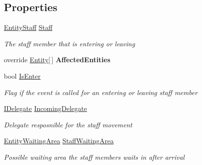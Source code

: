 \subsection*{Properties}
\begin{DoxyCompactItemize}
\item 
\hyperlink{class_simulation_core_1_1_h_c_c_m_elements_1_1_entity_staff}{Entity\+Staff} \hyperlink{class_general_health_care_elements_1_1_events_1_1_event_control_unit_staff_enter_leave_a3da4da7b0e7aef04a20e243946b8a324}{Staff}
\begin{DoxyCompactList}\small\item\em The staff member that is entering or leaving \end{DoxyCompactList}\item 
override \hyperlink{class_simulation_core_1_1_h_c_c_m_elements_1_1_entity}{Entity}\mbox{[}$\,$\mbox{]} {\bfseries Affected\+Entities}\hypertarget{class_general_health_care_elements_1_1_events_1_1_event_control_unit_staff_enter_leave_a26369090365f08bbcf88f4ddeef4bfab}{}\label{class_general_health_care_elements_1_1_events_1_1_event_control_unit_staff_enter_leave_a26369090365f08bbcf88f4ddeef4bfab}

\item 
bool \hyperlink{class_general_health_care_elements_1_1_events_1_1_event_control_unit_staff_enter_leave_a8ec37ba23d4b39d58ff93f45af63d507}{Is\+Enter}
\begin{DoxyCompactList}\small\item\em Flag if the event is called for an entering or leaving staff member \end{DoxyCompactList}\item 
\hyperlink{interface_simulation_core_1_1_h_c_c_m_elements_1_1_i_delegate}{I\+Delegate} \hyperlink{class_general_health_care_elements_1_1_events_1_1_event_control_unit_staff_enter_leave_a1b793ec64930fe5c53777b76d29bf9ed}{Incoming\+Delegate}
\begin{DoxyCompactList}\small\item\em Delegate resposnible for the staff movement \end{DoxyCompactList}\item 
\hyperlink{class_general_health_care_elements_1_1_entities_1_1_entity_waiting_area}{Entity\+Waiting\+Area} \hyperlink{class_general_health_care_elements_1_1_events_1_1_event_control_unit_staff_enter_leave_a9319335f7851e25630b6bb115d335366}{Staff\+Waiting\+Area}
\begin{DoxyCompactList}\small\item\em Possible waiting area the staff members waits in after arrival \end{DoxyCompactList}\end{DoxyCompactItemize}


